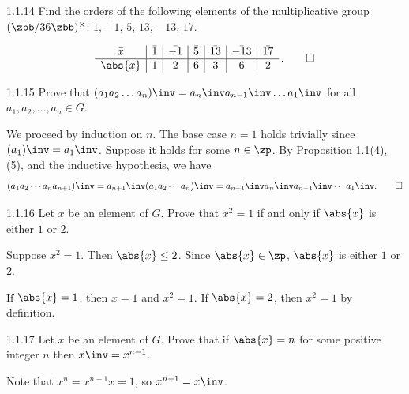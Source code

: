 \begin{exercise}{1.1.14}
    Find the orders of the following elements of the multiplicative group $(\zbb/36\zbb)^{\times}$: $\bar{1}$, $\bar{-1}$, $\bar{5}$, $\bar{13}$, $\bar{-13}$, $\bar{17}$.
\end{exercise}

\begin{sol}
    \[
    	\begin{array}{*{6}{c|}c}
            \bar x & \bar 1 & \bar{-1} & \bar 5 & \bar{13} & \bar{-13} & \bar{17} \\
            \hline
            \abs{\bar x} & 1 & 2 & 6 & 3 & 6 & 2
        \end{array}\,. \qedhere
	\]
\end{sol}

\begin{exercise}{1.1.15}
    Prove that $(a_1 a_2 \ldots a_n)\inv = a_n\inv a_{n-1}\inv \ldots a_1\inv$ for all $a_1, a_2, \ldots, a_n \in G$.
\end{exercise}

\begin{sol}
    We proceed by induction on $n$.
    The base case $n = 1$ holds trivially since $(a_1)\inv = a_1\inv$.
	Suppose it holds for some $n \in \zp$.
	By Proposition 1.1(4), (5), and the inductive hypothesis, we have
    \[
    	(a_1 a_2 \cdots a_n a_{n+1})\inv = a_{n+1}\inv (a_1 a_2 \cdots a_n)\inv = a_{n+1}\inv a_n\inv a_{n-1}\inv \cdots a_1\inv. \qedhere
    \]
\end{sol}

\begin{exercise}{1.1.16}
    Let $x$ be an element of $G$.
	Prove that $x^2 = 1$ if and only if $\abs{x}$ is either $1$ or $2$.
\end{exercise}

\begin{soliff}
    \rightimp Suppose $x^2 = 1$.
	Then $\abs{x} \leq 2$.
	Since $\abs{x} \in \zp$, $\abs{x}$ is either $1$ or $2$.

    \leftimp If $\abs{x} = 1$, then $x = 1$ and $x^2 = 1$.
	If $\abs{x} = 2$, then $x^2 = 1$ by definition.
\end{soliff}

\begin{exercise}{1.1.17}
    Let $x$ be an element of $G$.
	Prove that if $\abs{x} = n$ for some positive integer $n$ then $x\inv = x^{n-1}$.
\end{exercise}

\begin{sol}
    Note that $x^n = x^{n - 1}x = 1$, so $x^{n - 1} = x\inv$.
\end{sol}


